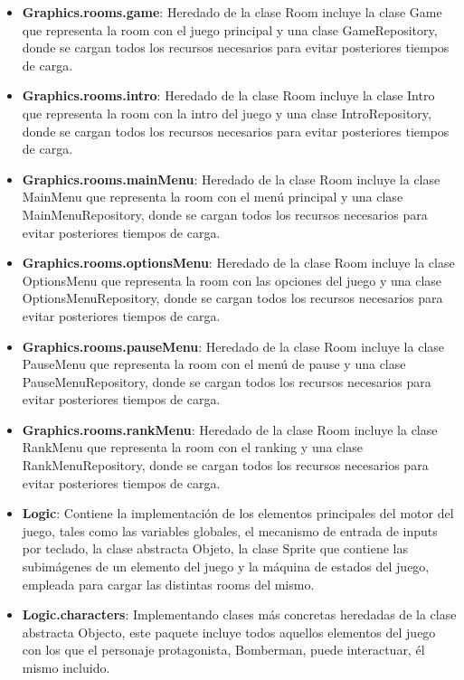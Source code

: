 \documentclass[a4paper]{article}
\begin{document}
\begin{itemize}
	\item \textbf{Graphics.rooms.game}: Heredado de la clase Room incluye la clase Game que representa la room con el juego principal y una clase  GameRepository, donde se cargan todos los recursos necesarios para evitar posteriores tiempos de carga.
	
	\item \textbf{Graphics.rooms.intro}: Heredado de la clase Room incluye la clase Intro que representa la room con la intro del juego y una clase  IntroRepository, donde se cargan todos los recursos necesarios para evitar posteriores tiempos de carga.
	
	\item \textbf{Graphics.rooms.mainMenu}: Heredado de la clase Room incluye la clase MainMenu que representa la room con el menú principal y una clase  MainMenuRepository, donde se cargan todos los recursos necesarios para evitar posteriores tiempos de carga.
	
	\item \textbf{Graphics.rooms.optionsMenu}: Heredado de la clase Room incluye la clase OptionsMenu que representa la room con las opciones del juego y una clase  OptionsMenuRepository, donde se cargan todos los recursos necesarios para evitar posteriores tiempos de carga.
	
	\item \textbf{Graphics.rooms.pauseMenu}: Heredado de la clase Room incluye la clase PauseMenu que representa la room con el menú de pause y una clase  PauseMenuRepository, donde se cargan todos los recursos necesarios para evitar posteriores tiempos de carga.
	
	\item \textbf{Graphics.rooms.rankMenu}: Heredado de la clase Room incluye la clase RankMenu que representa la room con el ranking y una clase  RankMenuRepository, donde se cargan todos los recursos necesarios para evitar posteriores tiempos de carga.
	
	\item \textbf{Logic}: Contiene la implementación de los elementos principales del motor del juego, tales como las variables globales, el mecanismo de entrada de inputs por teclado, la clase abstracta Objeto, la clase Sprite que contiene las subimágenes de un elemento del juego y la máquina de estados del juego, empleada para cargar las distintas rooms del mismo.
	
	\item \textbf{Logic.characters}: Implementando clases más concretas heredadas de la clase abstracta Objecto, este paquete incluye todos aquellos elementos del juego con los que el personaje protagonista, Bomberman, puede interactuar, él mismo incluido.
	

\end{itemize}
\end{document}
